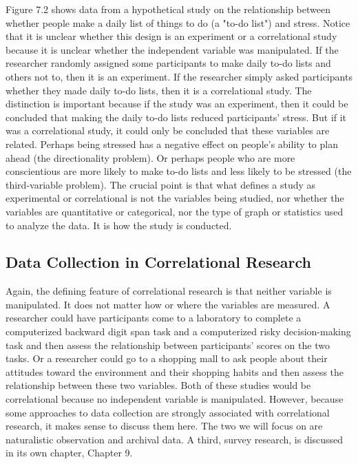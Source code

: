 Figure 7.2 shows data from a hypothetical study on the relationship between whether people make a daily list of things to do (a "to-do list") and stress. Notice that it is unclear whether this design is an experiment or a correlational study because it is unclear whether the independent variable was manipulated. If the researcher randomly assigned some participants to make daily to-do lists and others not to, then it is an experiment. If the researcher simply asked participants whether they made daily to-do lists, then it is a correlational study. The distinction is important because if the study was an experiment, then it could be concluded that making the daily to-do lists reduced participants' stress. But if it was a correlational study, it could only be concluded that these variables are related. Perhaps being stressed has a negative effect on people's ability to plan ahead (the directionality problem). Or perhaps people who are more conscientious are more likely to make to-do lists and less likely to be stressed (the third-variable problem). The crucial point is that what defines a study as experimental or correlational is not the variables being studied, nor whether the variables are quantitative or categorical, nor the type of graph or statistics used to analyze the data. It is how the study is conducted.

\subsection{Data Collection in Correlational Research}


Again, the defining feature of correlational research is that neither variable is manipulated. It does not matter how or where the variables are measured. A researcher could have participants come to a laboratory to complete a computerized backward digit span task and a computerized risky decision-making task and then assess the relationship between participants' scores on the two tasks. Or a researcher could go to a shopping mall to ask people about their attitudes toward the environment and their shopping habits and then assess the relationship between these two variables. Both of these studies would be correlational because no independent variable is manipulated. However, because some approaches to data collection are strongly associated with correlational research, it makes sense to discuss them here. The two we will focus on are naturalistic observation and archival data. A third, survey research, is discussed in its own chapter, Chapter 9.


